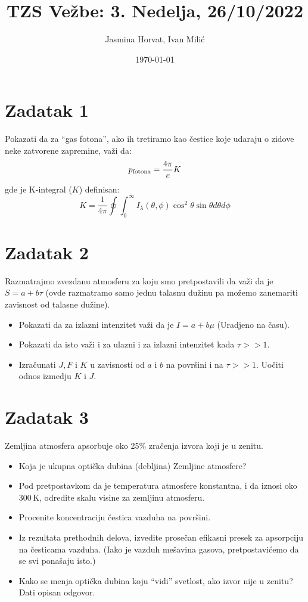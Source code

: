 \documentclass[12pt]{article}
\title{TZS Ve\v{z}be: 3. Nedelja, 26/10/2022}
\author{Jasmina Horvat, Ivan Mili\'{c}}
\date{\today}
\begin{document}
\maketitle

\section{Zadatak 1}
Pokazati da za ``gas fotona'', ako ih tretiramo kao \v{c}estice koje udaraju o zidove neke zatvorene zapremine, va\v{z}i da: 
\begin{equation}
p_{\rm fotona} = \frac{4\pi}{c} K
\end{equation}
gde je K-integral ($K$) definisan:
\begin{equation}
K = \frac{1}{4\pi}\oint \int_0^{\infty}I_\lambda(\theta,\phi)\cos^2 \theta \sin \theta d \theta d \phi
\end{equation}

\section{Zadatak 2}
Razmatrajmo zvezdanu atmosferu za koju smo pretpostavili da va\v{z}i da je $S=a+b\tau$ (ovde razmatramo samo jednu talasnu du\v{z}inu pa mo\v{z}emo zanemariti zavisnost od talasne du\v{z}ine).
\begin{itemize}
    \item Pokazati da za izlazni intenzitet va\v{z}i da je $I = a +b\mu$ (Uradjeno na \v{c}asu).

    \item Pokazati da isto va\v{z}i i za ulazni i za izlazni intenzitet kada $\tau >> 1$.

    \item Izra\v{c}unati $J, F$ i $K$ u zavisnosti od $a$ i $b$ na povr\v{s}ini i na $\tau >> 1$. Uo\v{c}iti odnos izmedju $K$ i $J$. 
\end{itemize}



\section{Zadatak 3}

Zemljina atmosfera apsorbuje oko 25\% zra\v{c}enja izvora koji je u zenitu.
\begin{itemize}
    \item Koja je ukupna opti\v{c}ka dubina (debljina) Zemljine atmosfere?
    \item Pod pretpostavkom da je temperatura atmosfere konstantna, i da iznosi oko 300\,K, odredite skalu visine za zemljinu atmosferu.
    \item Procenite koncentraciju \v{c}estica vazduha na povr\v{s}ini. 
    \item Iz rezultata prethodnih delova, izvedite prose\v{c}an efikasni presek za apsorpciju na \v{c}esticama vazduha. (Iako je vazduh me\v{s}avina gasova, pretpostavi\'{c}emo da se svi pona\v{s}aju isto.)
    \item Kako se menja opti\v{c}ka dubina koju ``vidi'' svetlost, ako izvor nije u zenitu? Dati opisan odgovor.
\end{itemize}
\end{document}
